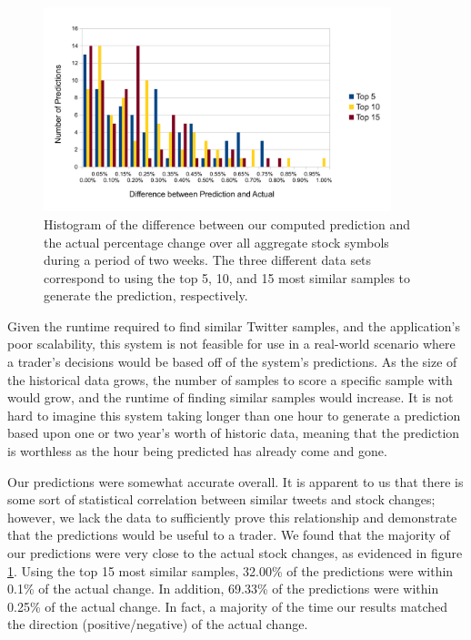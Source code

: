 \documentclass[twocolumn]{article}
\begin{document}
\begin{figure}
\centering
\includegraphics[width=0.9\textwidth]{histogram}
\caption{Histogram of the difference between our computed prediction and the actual percentage change over all aggregate stock symbols during a period of two weeks. The three different data sets correspond to using the top 5, 10, and 15 most similar samples to generate the prediction, respectively.}
\label{histogram}
\end{figure}

Given the runtime required to find similar Twitter samples, and the application's poor scalability, this system is not feasible for use in a real-world scenario where a trader's decisions would be based off of the system's predictions. As the size of the historical data grows, the number of samples to score a specific sample with would grow, and the runtime of finding similar samples would increase. It is not hard to imagine this system taking longer than one hour to generate a prediction based upon one or two year's worth of historic data, meaning that the prediction is worthless as the hour being predicted has already come and gone.

Our predictions were somewhat accurate overall. It is apparent to us that there is some sort of statistical correlation between similar tweets and stock changes; however, we lack the data to sufficiently prove this relationship and demonstrate that the predictions would be useful to a trader. We found that the majority of our predictions were very close to the actual stock changes, as evidenced in figure \ref{histogram}. Using the top 15 most similar samples, 32.00\% of the predictions were within 0.1\% of the actual change. In addition, 69.33\% of the predictions were within 0.25\% of the actual change. In fact, a majority of the time our results matched the direction (positive/negative) of the actual change. 
\end{document}

